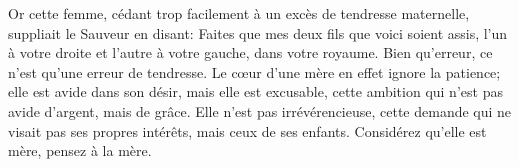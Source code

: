Or cette femme, cédant trop facilement à un excès de tendresse maternelle,
	suppliait le Sauveur en disant:
	Faites que mes deux fils que voici soient assis,
	l’un à votre droite et l’autre à votre gauche, dans votre royaume.
Bien qu’erreur, ce n’est qu’une erreur de tendresse.
Le cœur d’une mère en effet ignore la patience;
	elle est avide dans son désir, mais elle est excusable,
	cette ambition qui n’est pas avide d’argent, mais de grâce.
Elle n’est pas irrévérencieuse,
	cette demande qui ne visait pas ses propres intérêts,
	mais ceux de ses enfants.
	Considérez qu’elle est mère, pensez à la mère.
